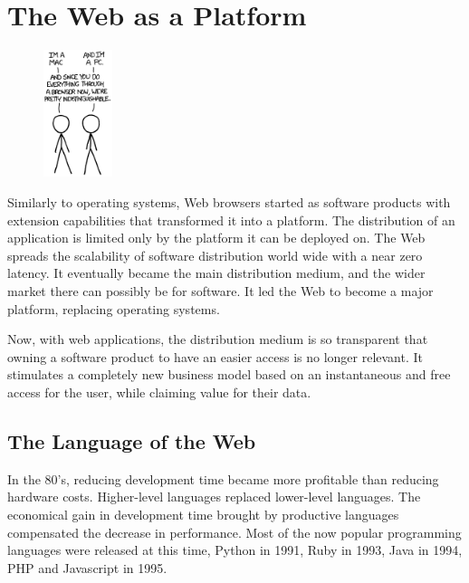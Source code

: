 \section{The Web as a Platform} \label{chapter2:web-as-a-platform}

\begin{figure}
  \vspace{-27pt}
  \begin{center}
    \includegraphics[width=0.18\textwidth]{../resources/Mac-PC.png}
  \end{center}
  \vspace{-20pt}
\end{figure}

Similarly to operating systems, Web browsers started as software products with extension capabilities that transformed it into a platform. %
The distribution of an application is limited only by the platform it can be deployed on.
The Web spreads the scalability of software distribution world wide with a near zero latency.
It eventually became the main distribution medium, and the wider market there can possibly be for software.
It led the Web to become a major platform, replacing operating systems.

Now, with web applications, the distribution medium is so transparent that owning a software product to have an easier access is no longer relevant.
It stimulates a completely new business model based on an instantaneous and free access for the user, while claiming value for their data.

\subsection{The Language of the Web}

In the 80's, reducing development time became more profitable than reducing hardware costs.
Higher-level languages replaced lower-level languages.
The economical gain in development time brought by productive languages compensated the decrease in performance.
Most of the now popular programming languages were released at this time, Python in 1991, Ruby in 1993, Java in 1994, PHP and Javascript in 1995.

